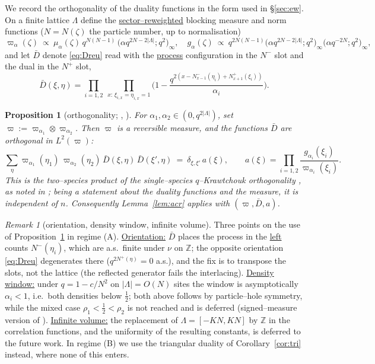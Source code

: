 \documentclass[11pt]{article}
\theoremstyle{plain}
\newtheorem{proposition}[theorem]{Proposition}
\theoremstyle{definition}
\theoremstyle{remark}
\newtheorem{remark}[theorem]{Remark}
\newcommand{\Z}{\mathbb{Z}}\newcommand{\R}{\mathbb{R}}\newcommand{\N}{\mathbb{N}}
\begin{document}
We record the orthogonality of the duality functions in the form used in
\S\ref{sec:ew}. On a finite lattice $\Lambda$ define the \underline{sector--reweighted}
blocking measure and norm functions ($N=N(\zeta)$ the particle number, up to
normalisation)
\begin{equation}\label{eq:omegadef}
  \varpi_\alpha(\zeta)\ \propto\ \mu_\alpha(\zeta)\,q^{N(N-1)}\,
  \big(\alpha q^{2N-2|\Lambda|};q^2\big)_\infty,\quad
  g_\alpha(\zeta)\ \propto\ q^{2N(N-1)}
  \big(\alpha q^{2N-2|\Lambda|};q^2\big)_\infty\big(\alpha q^{-2N};q^2\big)_\infty,
\end{equation}
and let $\bar D$ denote \eqref{eq:Dreu} read with the \underline{process} configuration in
the $N^-$ slot and the dual in the $N^+$ slot,
\[
  \bar D(\xi,\eta)=\prod_{i=1,2}\ \prod_{x:\,\xi_{i,x}=\eta_{i,x}=1}
  \Big(1-\frac{q^{2\left(x-N^-_{x-1}(\eta_i)+N^+_{x+1}(\xi_i)\right)}}{\alpha_i}\Big).
\]

\begin{proposition}[orthogonality; {\cite[Thm.~3.2]{CFG20}}, {\cite[\S3.1]{REU}}]
\label{prop:orth}
For $\alpha_1,\alpha_2\in(0,q^{2|\Lambda|})$, set
$\varpi:=\varpi_{\alpha_1}\otimes\varpi_{\alpha_2}$. Then $\varpi$ is a reversible
measure, and the functions $\bar D$ are orthogonal in $L^2(\varpi)$:
\begin{equation}\label{eq:orthexact}
  \sum_\eta \varpi_{\alpha_1}(\eta_1)\,\varpi_{\alpha_2}(\eta_2)\,
  \bar D(\xi,\eta)\,\bar D(\xi',\eta)\ =\ \delta_{\xi,\xi'}\,a(\xi),\qquad
  a(\xi)=\prod_{i=1,2}\frac{g_{\alpha_i}(\xi_i)}{\varpi_{\alpha_i}(\xi_i)}.
\end{equation}
This is the two--species product of the single--species $q$--Krawtchouk orthogonality
\cite[Thm.~3.2]{CFG20}, as noted in \cite[\S3.1]{REU}; being a statement about the
duality functions and the measure, it is independent of $n$. Consequently
Lemma~\ref{lem:acr} applies with $(\varpi,\bar D,a)$.
\end{proposition}

\begin{remark}[orientation, density window, infinite volume]\label{rem:orthstatus}
Three points on the use of Proposition~\ref{prop:orth} in regime (A). \underline{Orientation:}
$\bar D$ places the process in the \underline{left} counts $N^-(\eta_i)$, which are a.s.\
finite under $\nu$ on $\Z$; the opposite orientation \eqref{eq:Dreu} degenerates there
($q^{2N^+(\eta)}=0$ a.s.), and the fix is to transpose the slots, not the lattice (the
reflected generator fails the interlacing). \underline{Density window:} under $q=1-c/N^2$ on
$|\Lambda|=O(N)$ sites the window is asymptotically $\alpha_i<1$, i.e.\ both densities
below $\tfrac12$; both above follows by particle--hole symmetry, while the mixed case
$\rho_1<\tfrac12<\rho_2$ is not reached and is deferred (signed--measure version of
\cite[Thm.~3.2]{CFG20}). \underline{Infinite volume:} the replacement of $\Lambda=[-KN,KN]$
by $\Z$ in the correlation functions, and the uniformity of the resulting constants,
is deferred to the future work. In regime (B) we use the triangular duality of
Corollary~\ref{cor:tri} instead, where none of this enters.
\end{remark}
\end{document}
